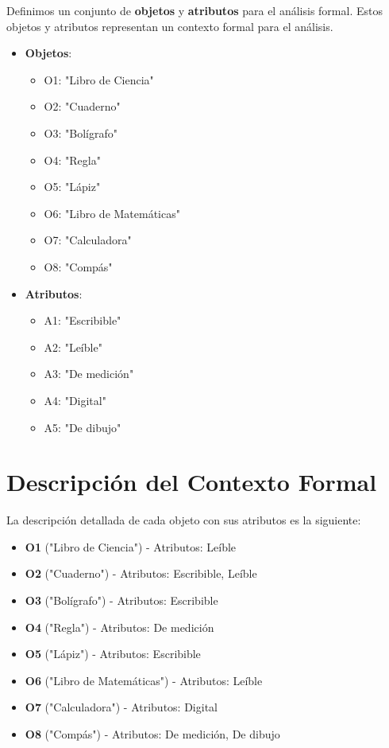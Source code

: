 Definimos un conjunto de \textbf{objetos} y \textbf{atributos} para el análisis formal. Estos objetos y atributos representan un contexto formal para el análisis.

\begin{itemize}
  \item \textbf{Objetos}:
  \begin{itemize}
      \item O1: "Libro de Ciencia"
      \item O2: "Cuaderno"
      \item O3: "Bolígrafo"
      \item O4: "Regla"
      \item O5: "Lápiz"
      \item O6: "Libro de Matemáticas"
      \item O7: "Calculadora"
      \item O8: "Compás"
  \end{itemize}
\end{itemize}

\begin{itemize}
  \item \textbf{Atributos}:
  \begin{itemize}
      \item A1: "Escribible"
      \item A2: "Leíble"
      \item A3: "De medición"
      \item A4: "Digital"
      \item A5: "De dibujo"
  \end{itemize}
\end{itemize}

\section{Descripción del Contexto Formal}

La descripción detallada de cada objeto con sus atributos es la siguiente:

\begin{itemize}
    \item \textbf{O1} ("Libro de Ciencia") - Atributos: Leíble
    \item \textbf{O2} ("Cuaderno") - Atributos: Escribible, Leíble
    \item \textbf{O3} ("Bolígrafo") - Atributos: Escribible
    \item \textbf{O4} ("Regla") - Atributos: De medición
    \item \textbf{O5} ("Lápiz") - Atributos: Escribible
    \item \textbf{O6} ("Libro de Matemáticas") - Atributos: Leíble
    \item \textbf{O7} ("Calculadora") - Atributos: Digital
    \item \textbf{O8} ("Compás") - Atributos: De medición, De dibujo
\end{itemize}

